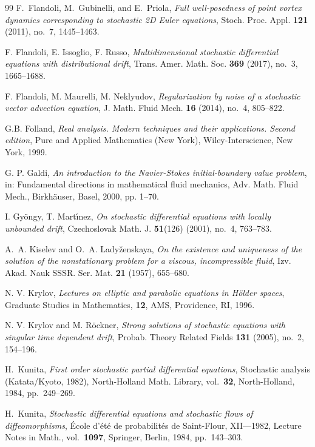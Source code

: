 \documentclass[a4paper,10pt]{article}
\newcommand\1{\mathbbm{1}}
\numberwithin{equation}{section}
\begin{document}
\begin{thebibliography}{99}
F.~Flandoli, M.~Gubinelli, and E.~Priola, \textit{Full well-posedness of point vortex dynamics corresponding to stochastic 2D Euler equations}, Stoch. Proc. Appl. \textbf{{\bf121}} (2011), no.~7, 1445--1463.

F. Flandoli, E. Issoglio, F. Russo, \textit{Multidimensional stochastic differential equations with distributional drift}, Trans. Amer. Math. Soc. \textbf{369} (2017), no.~3, 1665--1688. 

F. Flandoli, M. Maurelli, M. Neklyudov, \textit{Regularization by noise of a
stochastic vector advection equation}, J. Math. Fluid Mech. {\bf16} (2014), no.~4, 805--822.

G.B. Folland, \textit{Real analysis. Modern techniques and their applications. Second edition}, Pure and Applied Mathematics (New York), Wiley-Interscience, New York, 1999.

G. P. Galdi, \textit{An introduction to the Navier-Stokes
initial-boundary value problem}, in: Fundamental directions in mathematical
fluid mechanics, Adv. Math. Fluid Mech., Birkh\"{a}user, Basel, 2000, pp. 1--70.

I. Gy\"{o}ngy, T. Mart\'{\i}nez, \textit{On stochastic differential equations with
locally unbounded drift}, Czechoslovak Math. J. \textbf{51}(126) (2001), no.~4, 763--783.

A.~A. Kiselev and O.~A. Lady{\v{z}}enskaya, \emph{On the existence and
  uniqueness of the solution of the nonstationary problem for a viscous,
  incompressible fluid}, Izv. Akad. Nauk SSSR. Ser. Mat. \textbf{{\bf 21}}
  (1957), 655--680.
  
N. V. Krylov, \textit{Lectures on elliptic and parabolic equations in H\"older spaces}, Graduate Studies in Mathematics, \textbf{12}, AMS, Providence, RI, 1996.

N. V. Krylov and M. R{\"o}ckner, \textit{Strong solutions of stochastic equations
  with singular time dependent drift}, Probab. Theory Related Fields
  \textbf{{\bf131}} (2005), no.~2, 154--196.

H.~Kunita, \textit{First order stochastic partial differential equations},
  Stochastic analysis ({K}atata/{K}yoto, 1982), North-Holland Math. Library,
  vol.~{\bf32}, North-Holland, 1984, pp.~249--269.

H.~Kunita, \textit{Stochastic differential equations and stochastic flows of
  diffeomorphisms}, \'{E}cole d'\'et\'e de probabilit\'es de {S}aint-{F}lour,
  {XII}---1982, Lecture Notes in Math., vol.~{\bf1097}, Springer, Berlin, 1984,
  pp.~143--303.


\end{thebibliography}
\end{document}
